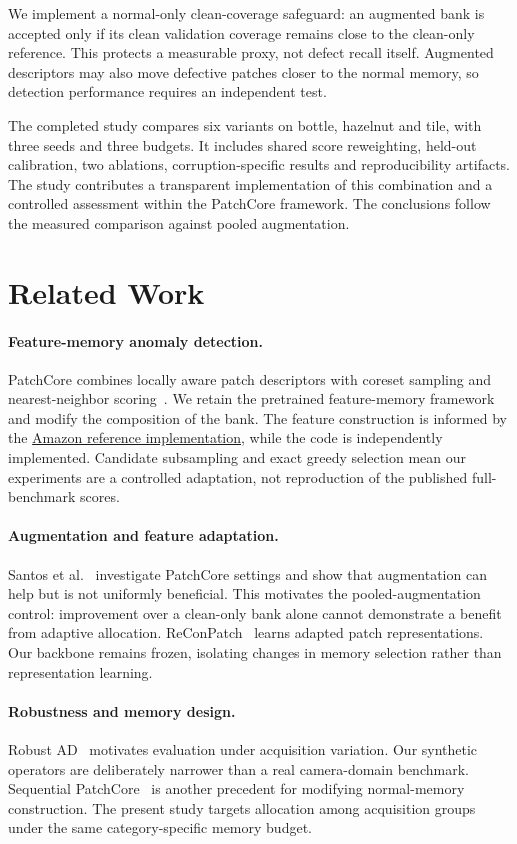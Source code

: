 \documentclass[10pt,twocolumn,letterpaper]{article}
\begin{document}
We implement a normal-only clean-coverage safeguard: an augmented bank is accepted only if its clean validation coverage remains close to the clean-only reference. This protects a measurable proxy, not defect recall itself. Augmented descriptors may also move defective patches closer to the normal memory, so detection performance requires an independent test.

The completed study compares six variants on bottle, hazelnut and tile, with three seeds and three budgets. It includes shared score reweighting, held-out calibration, two ablations, corruption-specific results and reproducibility artifacts. The study contributes a transparent implementation of this combination and a controlled assessment within the PatchCore framework. The conclusions follow the measured comparison against pooled augmentation.

\section{Related Work}
\paragraph{Feature-memory anomaly detection.}
PatchCore combines locally aware patch descriptors with coreset sampling and nearest-neighbor scoring~\cite{roth2022}. We retain the pretrained feature-memory framework and modify the composition of the bank. The feature construction is informed by the \href{https://github.com/amazon-science/patchcore-inspection}{Amazon reference implementation}, while the code is independently implemented. Candidate subsampling and exact greedy selection mean our experiments are a controlled adaptation, not reproduction of the published full-benchmark scores.

\paragraph{Augmentation and feature adaptation.}
Santos et al.~\cite{santos2023} investigate PatchCore settings and show that augmentation can help but is not uniformly beneficial. This motivates the pooled-augmentation control: improvement over a clean-only bank alone cannot demonstrate a benefit from adaptive allocation. ReConPatch~\cite{hyun2024} learns adapted patch representations. Our backbone remains frozen, isolating changes in memory selection rather than representation learning.

\paragraph{Robustness and memory design.}
Robust AD~\cite{pemula2025} motivates evaluation under acquisition variation. Our synthetic operators are deliberately narrower than a real camera-domain benchmark. Sequential PatchCore~\cite{mao2025} is another precedent for modifying normal-memory construction. The present study targets allocation among acquisition groups under the same category-specific memory budget.
\end{document}
